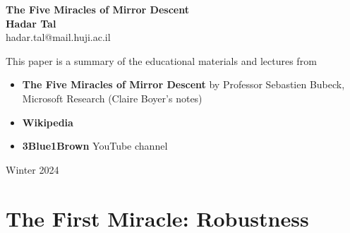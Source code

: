 \documentclass[11pt]{book} %
\begin{document}
\begin{titlepage}
    \begin{center}
     {\huge\bfseries 
     The Five Miracles of Mirror Descent \\}
     \vspace{1.5cm}
     {\Large\bfseries Hadar Tal}\\[5pt]
     hadar.tal@mail.huji.ac.il\\[14pt]
     \vspace{2cm}
     {This paper is a summary of the educational materials and lectures from 
     \begin{itemize}
        \item \textbf{The Five Miracles of Mirror Descent} by Professor Sebastien Bubeck, Microsoft Research (Claire Boyer's notes)
        \item \textbf{Wikipedia}
        \item \textbf{3Blue1Brown} YouTube channel
     \end{itemize}
     }

     \vfill
    {Winter 2024}
    \end{center}
\end{titlepage}


\frontmatter
\tableofcontents


\mainmatter
\chapter{The First Miracle: Robustness}
\end{document}
